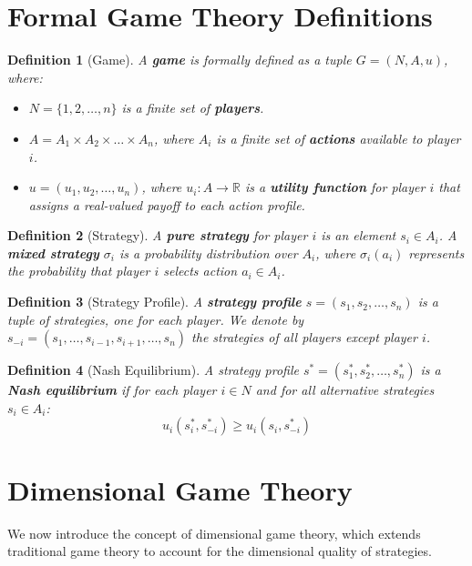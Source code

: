 \documentclass{article}
\newtheorem{definition}{Definition}
\begin{document}
\section{Formal Game Theory Definitions}

\begin{definition}[Game]
A \textbf{game} is formally defined as a tuple $G = (N, A, u)$, where:
\begin{itemize}
    \item $N = \{1, 2, \ldots, n\}$ is a finite set of \textbf{players}.
    \item $A = A_1 \times A_2 \times \ldots \times A_n$, where $A_i$ is a finite set of \textbf{actions} available to player $i$.
    \item $u = (u_1, u_2, \ldots, u_n)$, where $u_i: A \rightarrow \mathbb{R}$ is a \textbf{utility function} for player $i$ that assigns a real-valued payoff to each action profile.
\end{itemize}
\end{definition}

\begin{definition}[Strategy]
A \textbf{pure strategy} for player $i$ is an element $s_i \in A_i$. A \textbf{mixed strategy} $\sigma_i$ is a probability distribution over $A_i$, where $\sigma_i(a_i)$ represents the probability that player $i$ selects action $a_i \in A_i$.
\end{definition}

\begin{definition}[Strategy Profile]
A \textbf{strategy profile} $s = (s_1, s_2, \ldots, s_n)$ is a tuple of strategies, one for each player. We denote by $s_{-i} = (s_1, \ldots, s_{i-1}, s_{i+1}, \ldots, s_n)$ the strategies of all players except player $i$.
\end{definition}

\begin{definition}[Nash Equilibrium]
A strategy profile $s^* = (s_1^*, s_2^*, \ldots, s_n^*)$ is a \textbf{Nash equilibrium} if for each player $i \in N$ and for all alternative strategies $s_i \in A_i$:
\[u_i(s_i^*, s_{-i}^*) \geq u_i(s_i, s_{-i}^*)\]
\end{definition}

\section{Dimensional Game Theory}

We now introduce the concept of dimensional game theory, which extends traditional game theory to account for the dimensional quality of strategies.
\end{document}
